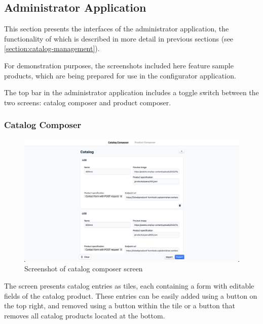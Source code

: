 \subsection{Administrator Application}

This section presents the interfaces of the administrator application, the functionality of which is described in more detail in previous sections (see \autoref{section:catalog-management}).

For demonstration purposes, the screenshots included here feature sample products, which are being prepared for use in the configurator application.

The top bar in the administrator application includes a toggle switch between the two screens: catalog composer and product composer.


\subsubsection{Catalog Composer}

\begin{figure}[h!]
\centering
\includegraphics[width=\textwidth]{images/screenshot_catalogcomposer.png}
\caption{Screenshot of catalog composer screen}
\label{fig:screenshot-catalogcomposer}
\end{figure}


The screen presents catalog entries as tiles, each containing a form with editable fields of the catalog product. These entries can be easily added using a button on the top right, and removed using a button within the tile or a button that removes all catalog products located at the bottom.

